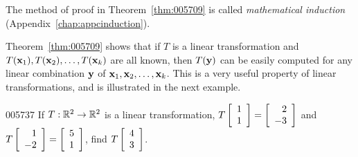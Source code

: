\noindent The method of proof in Theorem~\ref{thm:005709} is called \textit{mathematical induction} (Appendix~\ref{chap:appcinduction}).

Theorem~\ref{thm:005709} shows that if $T$ is a linear transformation and $T(\textbf{x}_{1}), T(\textbf{x}_{2}), \dots, T(\textbf{x}_{k})$ are all known, then $T(\textbf{y})$ can be easily computed for any linear combination $\textbf{y}$ of $\textbf{x}_{1}, \textbf{x}_{2}, \dots, \textbf{x}_{k}$. This is a very useful property of linear transformations, and is illustrated in the next example.

\begin{example}{}{005737}
If $T : \mathbb{R}^{2} \to \mathbb{R}^{2}$ is a linear transformation, $T \left[ \begin{array}{r}
1 \\
1
\end{array} \right] = \left[ \begin{array}{r}
2 \\
-3
\end{array} \right]$
 and $T \left[ \begin{array}{r}
 1 \\
 -2
 \end{array} \right] = \left[ \begin{array}{r}
 5 \\
 1
 \end{array} \right]$,
 find $T \left[ \begin{array}{r}
 4 \\
 3
 \end{array} \right]$.


\end{example}
